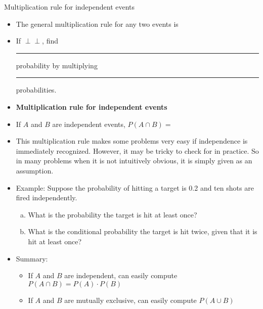 \documentclass{article}
\newcommand{\blankul}[1]{\rule[-1.5mm]{#1}{0.15mm}}	%
\newcommand{\ind}{\perp \!\!\! \perp}		%
\begin{document}
Multiplication rule for independent events\bigskip
\begin{itemize}
    \item The general multiplication rule for any two events is \vspace{40pt}
    \item[] If $\ind$, find \blankul{1.5cm} probability by multiplying \blankul{2.5cm} probabilities.
    \item \textbf{Multiplication rule for independent events}\bigskip
    \item[] If $A$ and $B$ are independent events, $P(A \cap B) = $\bigskip
    \item This multiplication rule makes some problems very easy if independence is immediately recognized. However, it may be tricky to check for in practice. So in many problems when it is not intuitively obvious, it is simply given as an assumption.
    \item[] Example: Suppose the probability of hitting a target is 0.2 and ten shots are fired independently.
    \begin{enumerate}[(a)]
        \item What is the probability the target is hit at least once?\vspace{60pt}
        \item What is the conditional probability the target is hit twice, given that it is hit at least once?\vspace{120pt}
    \end{enumerate}
    \item Summary:
    \begin{itemize}
        \item If $A$ and $B$ are independent, can easily compute $P(A \cap B) =  P(A) \cdot P(B)$\\
        \item If $A$ and $B$ are mutually exclusive, can easily compute $P(A \cup B)$ 
    \end{itemize}
\end{itemize}\bigskip
\end{document}
